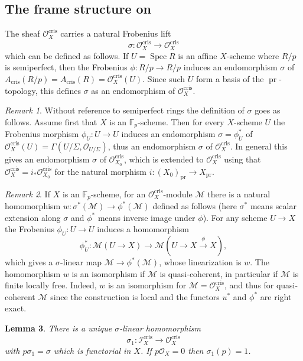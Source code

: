 \documentclass[a4paper,11pt]{article}
\theoremstyle{plain}
\newtheorem{Lemma}{Lemma}
\theoremstyle{definition}
\theoremstyle{remark}
\newtheorem{Remark}[Lemma]{Remark}
\theoremstyle{definition}
\numberwithin{Lemma}{section}
\numberwithin{Subpoint}{Lemma}
\numberwithin{equation}{section}
\newcommand{\III}{\mathcal{I}}
\newcommand{\MMM}{\mathcal{M}}
\newcommand{\OOO}{\mathcal{O}}
\newcommand{\FF}{{\mathbb{F}}}
\DeclareMathOperator{\Spec}{Spec}
\DeclareMathOperator{\cris}{cris}
\newcommand{\nameoftop}{{\operatorname{pr}}}
\newcommand{\chang}[1]{{#1}}
\begin{document}
\subsection*{The frame structure on \boldmath{$\OOO_X^{\cris}$}}

The sheaf $\OOO_X^{\cris}$ carries a natural Frobenius lift 
\[
\sigma:\OOO_X^{\cris}\to\OOO_X^{\cris}
\] 
which can be defined as follows.
If $U=\Spec R$ is an affine $X$-scheme where $R/p$ is semiperfect,
then the Frobenius $\phi:R/p\to R/p$ induces an endomorphism
$\sigma$ of $A_{\cris}(R/p)=A_{\cris}(R)=\OOO_X^{\cris}(U)$.
Since such $U$ form a basis of the $\nameoftop$-topology, 
this defines $\sigma$ as an endomorphism of $\OOO_X^{\cris}$.

\begin{Remark}
Without reference to semiperfect rings 
the definition of $\sigma$ goes as follows.
Assume first that $X$ is an $\FF_p$-scheme.
Then for \chang{every} $X$-scheme $U$ the Frobenius morphism $\phi_U:U\to U$ induces
an endomorphism $\sigma=\phi_U^*$ of
$\OOO_X^{\cris}(U)=\Gamma(U/\Sigma,\OOO_{U/\Sigma})$,
thus an endomorphism $\sigma$ of $\OOO_X^{\cris}$.
In general this gives an endomorphism $\sigma$ 
of $\OOO_{X_0}^{\cris}$,
which is extended to $\OOO_X^{\cris}$ using that 
$\OOO_X^{\cris}=i_*\OOO_{X_0}^{\cris}$ for the natural morphism
$i:(X_0)_\nameoftop\to X_\nameoftop$.
\end{Remark}

\begin{Remark}
\label{Rk:phi-sigma}
If $X$ is an $\FF_p$-scheme,
for an $\OOO_X^{\cris}$-module $\MMM$ there is a natural homomorphism
$w:\sigma^*(\MMM)\to\phi^*(\MMM)$ defined as follows 
(here $\sigma^*$ means scalar extension \chang{along} $\sigma$
and $\phi^*$ means inverse image under $\phi$).
For \chang{any} scheme $U\to X$ the Frobenius $\phi_U:U\to U$ induces a
homomorphism 
\[
\phi_U^*:\MMM(U\to X)\to\MMM(U\to X\xrightarrow\phi X),
\]
which gives a $\sigma$-linear map $\MMM\to\phi^*(\MMM)$,
whose linearization is $w$. 
The homomorphism $w$ is an isomorphism if $\MMM$ is quasi-coherent, 
in particular if $\MMM$ is finite locally free.
Indeed, $w$ is an isomorphism for $\MMM=\OOO_X^{\cris}$,
and thus for quasi-coherent $\MMM$ 
since the construction is local 
and the functors $u^*$ and $\phi^*$ are right exact.
\end{Remark}

\begin{Lemma}
\label{Le:sigma1-O}
There is a unique $\sigma$-linear homomorphism
\[
\sigma_1:\III_X^{\cris}\to\OOO_X^{\cris}
\]
with $p\sigma_1=\sigma$ which is functorial in $X$.
If $p\OOO_X=0$ then $\sigma_1(p)=1$.
\end{Lemma}
\end{document}

